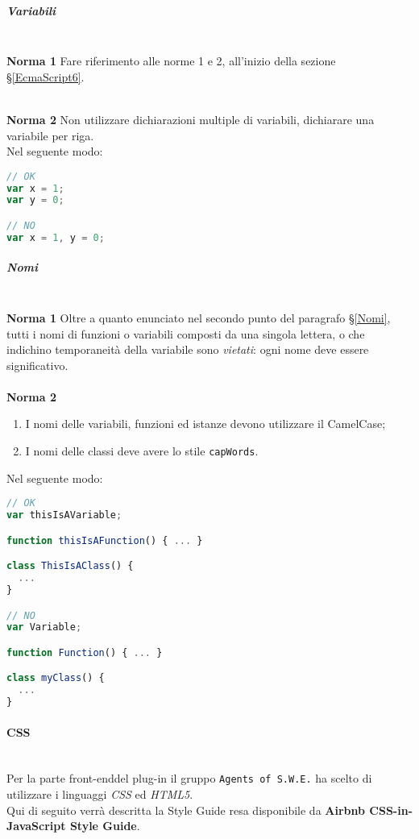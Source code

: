 \subparagraph{Variabili}\-\\
\textbf{Norma 1}
Fare riferimento alle norme 1 e 2, all'inizio della sezione §\ref{EcmaScript6}.

\-\\
\textbf{Norma 2}
Non utilizzare dichiarazioni multiple di variabili, dichiarare una variabile per riga.\\
Nel seguente modo:
\begin{lstlisting}[language=JavaScript]
// OK
var x = 1;
var y = 0;

// NO
var x = 1, y = 0;
\end{lstlisting}


\subparagraph{Nomi}\-\\
\textbf{Norma 1} Oltre a quanto enunciato nel secondo punto del paragrafo §\ref{Nomi}, tutti i nomi di funzioni o variabili composti da una singola lettera, o che indichino temporaneità della variabile sono \textit{vietati}: ogni nome deve essere significativo.\\
\-\\
\textbf{Norma 2} 
\begin{enumerate}
	\item I nomi delle variabili, funzioni ed istanze devono utilizzare il CamelCase;
	\item I nomi delle classi deve avere lo stile \texttt{capWords}.
\end{enumerate}
Nel seguente modo:
\begin{lstlisting}[language=JavaScript]
// OK
var thisIsAVariable;

function thisIsAFunction() { ... }

class ThisIsAClass() {
  ...
}

// NO
var Variable;

function Function() { ... }

class myClass() {
  ...
}
\end{lstlisting}

\paragraph{CSS}
\label{css} \-\\

Per la parte front-end\glossario del plug-in il gruppo \texttt{Agents of S.W.E.} ha scelto di utilizzare i linguaggi \textit{CSS} ed \textit{HTML5}.\\
Qui di seguito verrà descritta la Style Guide resa disponibile da \textbf{Airbnb CSS-in-JavaScript Style Guide}.

